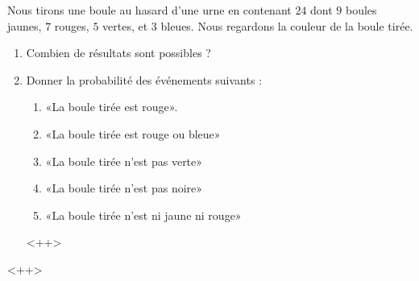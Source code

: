 
\begin{exercice}\label{exosmath-0189}

    Nous tirons une boule au hasard d'une urne en contenant \( 24\) dont \( 9\) boules jaunes, \( 7\) rouges, \( 5\) vertes, et \( 3\) bleues. Nous regardons la couleur de la boule tirée.
    \begin{enumerate}
        \item
            Combien de résultats sont possibles ?
        \item
            Donner la probabilité des événements suivants :
            \begin{enumerate}
                \item
                    «La boule tirée est rouge».
                \item
                    «La boule tirée est rouge ou bleue» 
                \item
                    «La boule tirée n'est pas verte» 
                \item
                    «La boule tirée n'est pas noire» 
                \item
                    «La boule tirée n'est ni jaune ni rouge»
            \end{enumerate}
            <++>
    \end{enumerate}
    <++>

\end{exercice}
